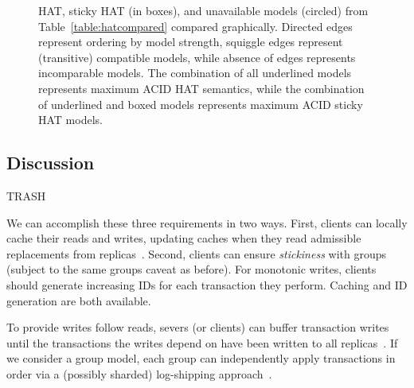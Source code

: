\begin{figure}
\label{fig:hat-order}
\caption{HAT, sticky HAT (in boxes), and unavailable models (circled)
  from Table~\protect\ref{table:hatcompared} compared graphically. Directed
  edges represent ordering by model strength, squiggle edges represent
  (transitive) compatible models, while absence of edges represents
  incomparable models. The combination of all underlined models
  represents maximum ACID HAT semantics, while the combination of
  underlined and boxed models represents maximum ACID sticky HAT
  models.}
\label{fig:hatcompared}
\end{figure}


\subsection{Discussion}
\label{sec:discussion}





TRASH

We can accomplish these three requirements in two ways. First, clients
can locally cache their reads and writes, updating caches when they
read admissible replacements from
replicas~\cite{sessionguarantees}. Second, clients can ensure
\textit{stickiness} with groups~\cite{vogels-defs} (subject to the
same groups caveat as before).  For monotonic writes, clients should
generate increasing IDs for each transaction they perform. Caching and
ID generation are both available.

To provide writes follow reads,
severs (or clients) can buffer transaction writes until the
transactions the writes depend on have been written to all
replicas~\cite{cops}. If we consider a group model, each group can
independently apply transactions in order via a (possibly sharded)
log-shipping approach~\cite{causalmemory, cops, eiger, swift}.




